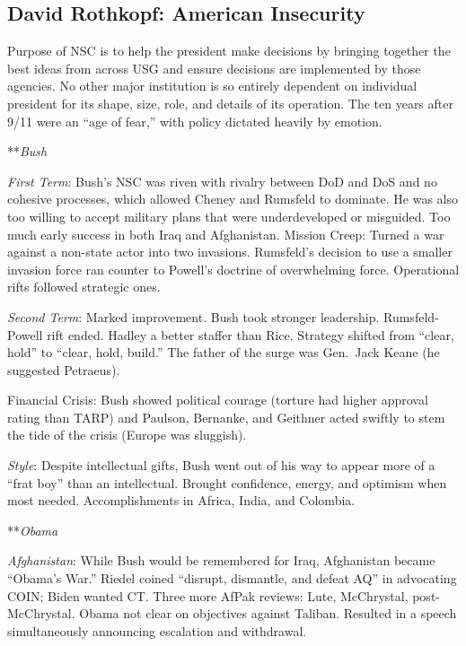 \documentclass[
]{article}
\begin{document}
\hypertarget{david-rothkopf-american-insecurity}{%
\subsection{David Rothkopf: American
Insecurity}\label{david-rothkopf-american-insecurity}}

Purpose of NSC is to help the president make decisions by bringing
together the best ideas from across USG and ensure decisions are
implemented by those agencies. No other major institution is so entirely
dependent on individual president for its shape, size, role, and details
of its operation. The ten years after 9/11 were an ``age of fear,'' with
policy dictated heavily by emotion.

**\emph{Bush}

\emph{First Term}: Bush's NSC was riven with rivalry between DoD and DoS
and no cohesive processes, which allowed Cheney and Rumsfeld to
dominate. He was also too willing to accept military plans that were
underdeveloped or misguided. Too much early success in both Iraq and
Afghanistan. Mission Creep: Turned a war against a non-state actor into
two invasions. Rumsfeld's decision to use a smaller invasion force ran
counter to Powell's doctrine of overwhelming force. Operational rifts
followed strategic ones.

\emph{Second Term}: Marked improvement. Bush took stronger leadership.
Rumsfeld-Powell rift ended. Hadley a better staffer than Rice. Strategy
shifted from ``clear, hold'' to ``clear, hold, build.'' The father of
the surge was Gen.~Jack Keane (he suggested Petraeus).

Financial Crisis: Bush showed political courage (torture had higher
approval rating than TARP) and Paulson, Bernanke, and Geithner acted
swiftly to stem the tide of the crisis (Europe was sluggish).

\emph{Style}: Despite intellectual gifts, Bush went out of his way to
appear more of a ``frat boy'' than an intellectual. Brought confidence,
energy, and optimism when most needed. Accomplishments in Africa, India,
and Colombia.

**\emph{Obama}

\emph{Afghanistan}: While Bush would be remembered for Iraq, Afghanistan
became ``Obama's War.'' Riedel coined ``disrupt, dismantle, and defeat
AQ'' in advocating COIN; Biden wanted CT. Three more AfPak reviews:
Lute, McChrystal, post-McChrystal. Obama not clear on objectives against
Taliban. Resulted in a speech simultaneously announcing escalation and
withdrawal.
\end{document}
